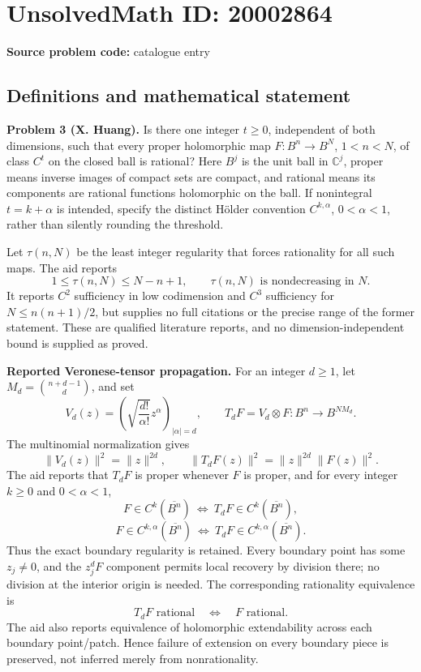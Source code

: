 \documentclass[11pt]{article}
\newcommand{\C}{\mathbb{C}}
\begin{document}
\section*{UnsolvedMath ID: 20002864}
\textbf{Source problem code:} catalogue entry
\subsection{Definitions and mathematical statement}
\textbf{Problem 3 (X. Huang).} Is there one integer \(t\geq0\), independent of both dimensions, such that every proper holomorphic map \(F:B^n\to B^N\), \(1<n<N\), of class \(C^t\) on the closed ball is rational? Here \(B^j\) is the unit ball in \(\C^j\), proper means inverse images of compact sets are compact, and rational means its components are rational functions holomorphic on the ball. If nonintegral \(t=k+\alpha\) is intended, specify the distinct H\"older convention \(C^{k,\alpha}\), \(0<\alpha<1\), rather than silently rounding the threshold.

Let \(\tau(n,N)\) be the least integer regularity that forces rationality for all such maps. The aid reports
\[
 1\leq\tau(n,N)\leq N-n+1,
 \qquad \tau(n,N)\text{ is nondecreasing in }N.
\]
It reports \(C^2\) sufficiency in low codimension and \(C^3\) sufficiency for \(N\leq n(n+1)/2\), but supplies no full citations or the precise range of the former statement. These are qualified literature reports, and no dimension-independent bound is supplied as proved.

\textbf{Reported Veronese-tensor propagation.} For an integer \(d\geq1\), let \(M_d=\binom{n+d-1}{d}\), and set
\[
 V_d(z)=\left(\sqrt{\frac{d!}{\alpha!}}z^\alpha\right)_{|\alpha|=d},
 \qquad T_dF=V_d\otimes F:B^n\to B^{NM_d}.
\]
The multinomial normalization gives
\[
 \|V_d(z)\|^2=\|z\|^{2d},\qquad
 \|T_dF(z)\|^2=\|z\|^{2d}\|F(z)\|^2.
\]
The aid reports that \(T_dF\) is proper whenever \(F\) is proper, and for every integer \(k\geq0\) and \(0<\alpha<1\),
\[
 F\in C^k(\overline{B^n})\ \Longleftrightarrow\ T_dF\in C^k(\overline{B^n}),
\]
\[
 F\in C^{k,\alpha}(\overline{B^n})\ \Longleftrightarrow\
 T_dF\in C^{k,\alpha}(\overline{B^n}).
\]
Thus the exact boundary regularity is retained. Every boundary point has some \(z_j\ne0\), and the \(z_j^dF\) component permits local recovery by division there; no division at the interior origin is needed. The corresponding rationality equivalence is
\[
 T_dF\text{ rational}\quad\Longleftrightarrow\quad F\text{ rational}.
\]
The aid also reports equivalence of holomorphic extendability across each boundary point/patch. Hence failure of extension on every boundary piece is preserved, not inferred merely from nonrationality.
\end{document}
